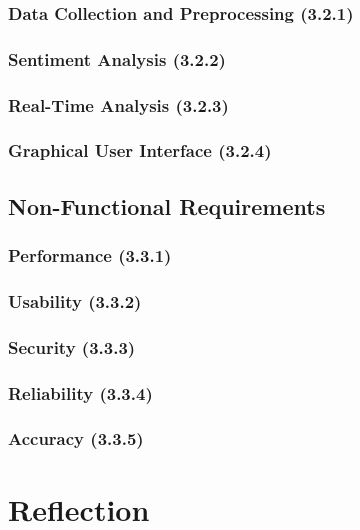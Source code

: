         \subsubsection{Data Collection and Preprocessing (3.2.1)}

        \subsubsection{Sentiment Analysis (3.2.2)}

        \subsubsection{Real-Time Analysis (3.2.3)}

        \subsubsection{Graphical User Interface (3.2.4)}

    \subsection{Non-Functional Requirements}

        \subsubsection{Performance (3.3.1)}

        \subsubsection{Usability (3.3.2)}

        \subsubsection{Security (3.3.3)}

        \subsubsection{Reliability (3.3.4)}

        \subsubsection{Accuracy (3.3.5)}

\section{Reflection}
